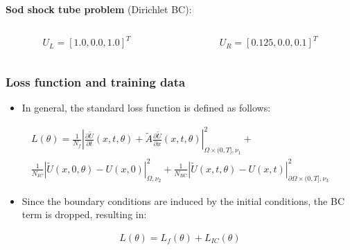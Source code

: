 \documentclass[aspectratio=169]{beamer}
\begin{document}
\begin{frame}
\begin{columns}
\begin{column}{0.5\textwidth}
			\textbf{Sod shock tube problem} (Dirichlet BC): 
			\begin{columns}
				\begin{column}{0.5\textwidth}
					\begin{equation*}
						U_L = [1.0, 0.0, 1.0]^T
					\end{equation*}
				\end{column}
								
				\begin{column}{0.5\textwidth}
					\begin{equation*}
						U_R = [0.125, 0.0, 0.1]^T
					\end{equation*}
				\end{column}	
			\end{columns}
			
			
						
		\end{column}
	\end{columns}

\end{frame}

\begin{frame}\frametitle{Loss function and training data}
	
	\begin{itemize}
		\item In general, the standard loss function is defined as follows:
	\end{itemize}

	\begin{gather*}
			L(\theta) = \frac{1}{N_f} \left | \frac{\partial \tilde{U}}{\partial t} (x,t,\theta) + \tilde{A} \frac{\partial \tilde{U}}{\partial x} (x, t, \theta) \right |^2_{\Omega \times (0, T],\nu_1} + \\ \frac{1}{N_{IC}} \left | \tilde{U}(x, 0, \theta) - U(x, 0) \right |^2_{\Omega,\nu_2} + \frac{1}{N_{BC}} \left | \tilde{U}(x, t, \theta) - U(x,t) \right |^2_{\partial \Omega \times (0, T],\nu_3}
	\end{gather*}
			
	\begin{itemize}
		\item Since the boundary conditions are induced by the initial conditions, the BC term is dropped, resulting in:
	\end{itemize}
	
	\begin{gather*}
		L(\theta) = L_f (\theta) + L_{IC}(\theta)
	\end{gather*}	

\end{frame}
\end{document}
